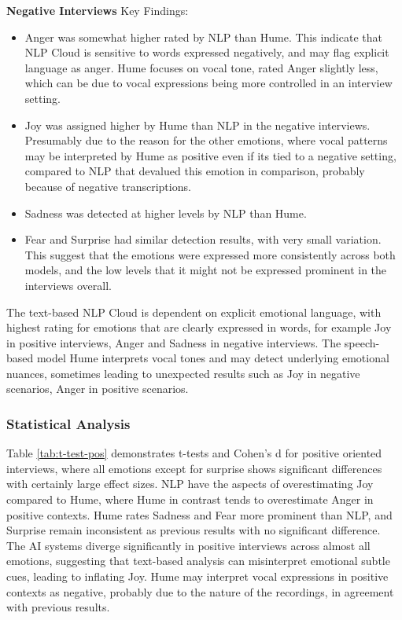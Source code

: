 \textbf{Negative Interviews}
Key Findings: 
\begin{itemize}
    \item Anger was somewhat higher rated by NLP than Hume. This indicate that NLP Cloud is sensitive to words expressed negatively, and may flag explicit language as anger. 
    Hume focuses on vocal tone, rated Anger slightly less, which can be due to vocal expressions being more controlled in an interview setting. 
    \item Joy was assigned higher by Hume than NLP in the negative interviews. Presumably due to the reason for the other emotions, where vocal patterns may be interpreted by Hume as positive even if its tied to a negative setting, 
    compared to NLP that devalued this emotion in comparison, probably because of negative transcriptions. 
    \item Sadness was detected at higher levels by NLP than Hume. 
    \item Fear and Surprise had similar detection results, with very small variation. This suggest that the emotions were expressed more consistently across both models, and the low levels that it might not be expressed prominent in the interviews overall. 
\end{itemize}

The text-based NLP Cloud is dependent on explicit emotional language, with highest rating for emotions that are clearly 
expressed in words, for example Joy in positive interviews, Anger and Sadness in negative interviews. 
The speech-based model Hume interprets vocal tones and may detect underlying emotional nuances, sometimes leading to unexpected results such 
as Joy in negative scenarios, Anger in positive scenarios. 

\subsubsection{Statistical Analysis}

Table \ref{tab:t-test-pos} demonstrates t-tests and Cohen's d for positive oriented interviews, where all emotions except for surprise shows significant differences 
with certainly large effect sizes. NLP have the aspects of overestimating Joy compared to Hume, where Hume in contrast tends to overestimate Anger in positive contexts. 
Hume rates Sadness and Fear more prominent than NLP, and Surprise remain inconsistent as previous results with no significant difference. 
The AI systems diverge significantly in positive interviews across almost all emotions, suggesting that text-based analysis can misinterpret 
emotional subtle cues, leading to inflating Joy. Hume may interpret vocal expressions in positive contexts as negative, probably due to the nature of the recordings, 
in agreement with previous results. 

